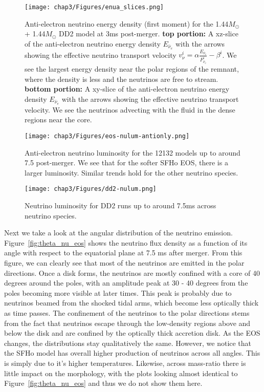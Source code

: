 \begin{figure}[!htbp]
  \centering
\texttt{[image: chap3/Figures/enua\_slices.png]}
\caption{
  Anti-electron neutrino energy density (first moment) for the 1.44$M_\odot$ + 1.44$M_\odot$ DD2 model at 3ms post-merger. \textbf{top portion:} A xz-slice of the anti-electron neutrino energy density $E_{\bar\nu_e}$ with the arrows showing the effective neutrino transport velocity $v_\nu^i = \alpha \frac{E_{\bar\nu_e}}{F^i_{\bar\nu_e}} - \beta^i$. We see the largest energy density near the polar regions of the remnant, where the density is less and the neutrinos are free to stream. \textbf{bottom portion:} A xy-slice of the anti-electron neutrino energy density $E_{\bar\nu_e}$ with the arrows showing the effective neutrino transport velocity. We see the neutrinos advecting with the fluid in the dense regions near the core.
}
  \label{fig:d144144_3ms_ENua}
\end{figure}
%

\begin{figure}[H]
  \centering
  \texttt{[image: chap3/Figures/eos-nulum-antionly.png]}
\caption{
  Anti-electron neutrino luminosity for the 12132 models up to around 7.5 post-merger. We see that for the softer SFHo EOS, there is a larger luminosity. Similar trends hold for the other neutrino species.
}
\label{fig:nulum_table_eos}
\end{figure}


\begin{figure}[H]
  \centering
  \texttt{[image: chap3/Figures/dd2-nulum.png]}
\caption{
  Neutrino luminosity for DD2 runs up to around 7.5ms across neutrino species.
}
\label{fig:nulum_table_dd2}
\end{figure}

Next we take a look at the angular distribution of the neutrino emission. Figure~\ref{fig:theta_nu_eos} shows the neutrino flux density as a function of its angle with respect to the equatorial plane at 7.5 ms after merger. From this figure, we can clearly see that most of the neutrinos are emitted in the polar directions. Once a disk forms, the neutrinos are mostly confined with a core of 40 degrees around the poles, with an amplitude peak at 30 - 40 degrees from the poles becoming more visible at later times. This peak is probably due to neutrinos beamed from the shocked tidal arms, which become less optically thick as time passes. The confinement of the neutrinos to the polar directions stems from the fact that neutrinos escape through the low-density regions above and below the disk and are confined by the optically thick accretion disk. As the EOS changes, the distributions stay qualitatively the same. However, we notice that the SFHo model has overall higher production of neutrinos across all angles. This is simply due to it's higher temperatures.
Likewise, across mass-ratio there is little impact on the morphology, with the plots looking almost identical to Figure~\ref{fig:theta_nu_eos} and thus we do not show them here.

